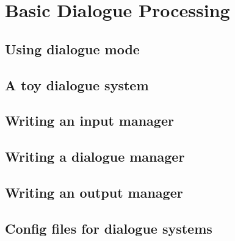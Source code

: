 \chapter{Basic Dialogue Processing}
\label{Chapter:BasicDialogue}

\author{Manny Rayner}

\section{Using dialogue mode}
\label{Section:DialogueMode}

\section{A toy dialogue system}
\label{Section:ToyDialogue}

\section{Writing an input manager}
\label{Section:InputManager}

\section{Writing a dialogue manager}
\label{Section:DialogueManager}

\section{Writing an output manager}
\label{Section:OutputManager}

\section{Config files for dialogue systems}
\label{Section:DialogueConfig}
